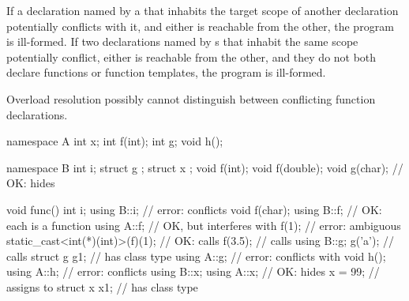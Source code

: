 \pnum
If a declaration named by a 
that inhabits the target scope of another declaration
potentially conflicts with it, and
either is reachable from the other, the program is ill-formed.
If two declarations named by s
that inhabit the same scope potentially conflict,
either is reachable from the other, and
they do not both declare functions or function templates,
the program is ill-formed.
\begin{note}
Overload resolution possibly cannot distinguish
between conflicting function declarations.
\end{note}
\begin{example}
\begin{codeblock}
namespace A {
  int x;
  int f(int);
  int g;
  void h();
}

namespace B {
  int i;
  struct g { };
  struct x { };
  void f(int);
  void f(double);
  void g(char);                         // OK: hides 
}

void func() {
  int i;
  using B::i;                           // error: conflicts
  void f(char);
  using B::f;                           // OK: each  is a function
  using A::f;                           // OK, but interferes with 
  f(1);                                 // error: ambiguous
  static_cast<int(*)(int)>(f)(1);       // OK: calls 
  f(3.5);                               // calls 
  using B::g;
  g('a');                               // calls 
  struct g g1;                          //  has class type 
  using A::g;                           // error: conflicts with 
  void h();
  using A::h;                           // error: conflicts
  using B::x;
  using A::x;                           // OK: hides 
  x = 99;                               // assigns to 
  struct x x1;                          //  has class type 
}
\end{codeblock}
\end{example}

